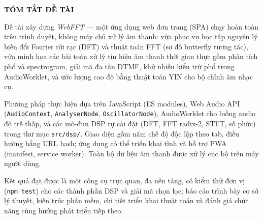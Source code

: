 \begin{center}
	\textbf{{\Large\textcolor{black}{TÓM TẮT ĐỀ TÀI}}}
\end{center}

\vspace{1cm}

\hspace*{2cm}
Đề tài xây dựng \textit{WebFFT} --- một ứng dụng web đơn trang (SPA) chạy hoàn toàn trên trình duyệt, không máy chủ xử lý âm thanh: vừa phục vụ học tập nguyên lý biến đổi Fourier rời rạc (DFT) và thuật toán FFT (sơ đồ butterfly tương tác), vừa minh họa các bài toán xử lý tín hiệu âm thanh thời gian thực gồm phân tích phổ và spectrogram, giải mã đa tần DTMF, khử nhiễu kiểu trừ phổ trong AudioWorklet, và ước lượng cao độ bằng thuật toán YIN cho bộ chỉnh âm nhạc cụ.

Phương pháp thực hiện dựa trên JavaScript (ES modules), Web Audio API (\texttt{AudioContext}, \texttt{AnalyserNode}, \texttt{OscillatorNode}), AudioWorklet cho luồng audio độ trễ thấp, và các mô-đun DSP tự cài đặt (DFT, FFT radix-2, STFT, số phức) trong thư mục \verb|src/dsp/|. Giao diện gồm năm chế độ độc lập theo tab, điều hướng bằng URL hash; ứng dụng có thể triển khai tĩnh và hỗ trợ PWA (manifest, service worker). Toàn bộ dữ liệu âm thanh được xử lý cục bộ trên máy người dùng.

Kết quả đạt được là một công cụ trực quan, đa nền tảng, có kiểm thử đơn vị (\texttt{npm test}) cho các thành phần DSP và giải mã chọn lọc; báo cáo trình bày cơ sở lý thuyết, kiến trúc phần mềm, chi tiết triển khai thuật toán và đánh giá chức năng cùng hướng phát triển tiếp theo.
